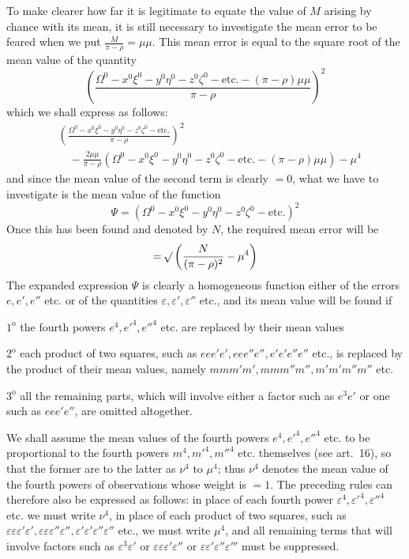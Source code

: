 To make clearer how far it is legitimate to equate the value of \(M\) arising by chance with its mean, it is still necessary to investigate the mean error to be feared when we put \(\frac{M}{\pi-\rho}=\mu\mu\). This mean error is equal to the square root of the mean value of the quantity
\[
\left(\frac{\Omega^0-x^0\xi^0-y^0\eta^0-z^0\zeta^0-\text{etc.}-(\pi-\rho)\mu\mu}{\pi-\rho}\right)^2
\]
which we shall express as follows:
\[
\begin{aligned}
&\left(\frac{\Omega^0-x^0\xi^0-y^0\eta^0-z^0\zeta^0-\text{etc.}}{\pi-\rho}\right)^2\\[4pt]
&\quad-\frac{2\mu\mu}{\pi-\rho}(\Omega^0-x^0\xi^0-y^0\eta^0-z^0\zeta^0-\text{etc.}-(\pi-\rho)\mu\mu)-\mu^4
\end{aligned}
\]
and since the mean value of the second term is clearly \(=0\), what we have to investigate is the mean value of the function
\[
\Psi=(\Omega^0-x^0\xi^0-y^0\eta^0-z^0\zeta^0-\text{etc.})^2
\]
Once this has been found and denoted by \(N\), the required mean error will be
\[
=\mathord{{}^{}\!\surd}\left(\frac{N}{(\pi-\rho)^2}-\mu^4\right)
\]
The expanded expression \(\Psi\) is clearly a homogeneous function either of the errors \(e,e',e''\) etc. or of the quantities \(\varepsilon,\varepsilon',\varepsilon''\) etc., and its mean value will be found if

\(1^\mathrm{o}\) the fourth powers \(e^4,e'^4,e''^4\) etc. are replaced by their mean values

\(2^\mathrm{o}\) each product of two squares, such as \(eee'e',\allowbreak eee''e'',\allowbreak e'e'e''e''\) etc., is replaced by the product of their mean values, namely \(mmm'm',\allowbreak mmm''m'',\allowbreak m'm'm''m''\) etc.
\par{}%
\(3^\mathrm{o}\) all the remaining parts, which will involve either a factor such as \(e^3e'\) or one such as \(eee'e''\), are omitted altogether.

We shall assume the mean values of the fourth powers \(e^4,\allowbreak e'^4,\allowbreak e''^4\) etc. to be proportional to the fourth powers \(m^4,\allowbreak m'^4,\allowbreak m''^4\) etc. themselves (see art.\ 16), so that the former are to the latter as \(\nu^4\) to \(\mu^4\); thus \(\nu^4\) denotes the mean value of the fourth powers of observations whose weight is \(=1\). The preceding rules can therefore also be expressed as follows: in place of each fourth power \(\varepsilon^4,\varepsilon'^4,\varepsilon''^4\) etc. we must write \(\nu^4\), in place of each product of two squares, such as \(\varepsilon\varepsilon\varepsilon'\varepsilon',\allowbreak\varepsilon\varepsilon\varepsilon''\varepsilon'',\allowbreak\varepsilon'\varepsilon'\varepsilon''\varepsilon''\) etc., we must write \(\mu^4\), and all remaining terms that will involve factors such as \(\varepsilon^3\varepsilon'\) or \(\varepsilon\varepsilon\varepsilon'\varepsilon''\) or \(\varepsilon\varepsilon'\varepsilon''\varepsilon'''\) must be suppressed.

